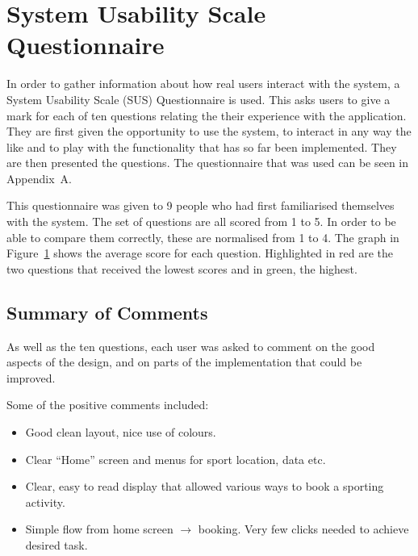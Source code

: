 \section{System Usability Scale Questionnaire}
\label{sec:system_usability_scale_questionnaire}

In order to gather information about how real users interact with the system, a
System Usability Scale (SUS) Questionnaire is used. This asks users to give a
mark for each of ten questions relating the their experience with the
application. They are first given the opportunity to use the system, to
interact in any way the like and to play with the functionality that has so far
been implemented. They are then presented the questions. The questionnaire that
was used can be seen in Appendix~A.

This questionnaire was given to 9 people who had first familiarised themselves
with the system. The set of questions are all scored from 1 to 5. In order to
be able to compare them correctly, these are normalised from 1 to 4. The graph
in Figure~\ref{fig:evalGraph} shows the average score for each question.
Highlighted in red are the two questions that received the lowest scores and in
green, the highest.

\begin{figure}[h]
\centering

\caption{}\label{fig:evalGraph}
\end{figure}

\subsection{Summary of Comments}
\label{sub:summary_of_comments}

As well as the ten questions, each user was asked to comment on the good
aspects of the design, and on parts of the implementation that could be
improved.

Some of the positive comments included:
\begin{itemize}
	\item Good clean layout, nice use of colours.
	\item Clear ``Home'' screen and menus for sport location, data etc.
	\item Clear, easy to read display that allowed various ways to book a
		sporting activity.
	\item Simple flow from home screen $\rightarrow$ booking. Very few clicks
		needed to achieve desired task.
\end{itemize}

